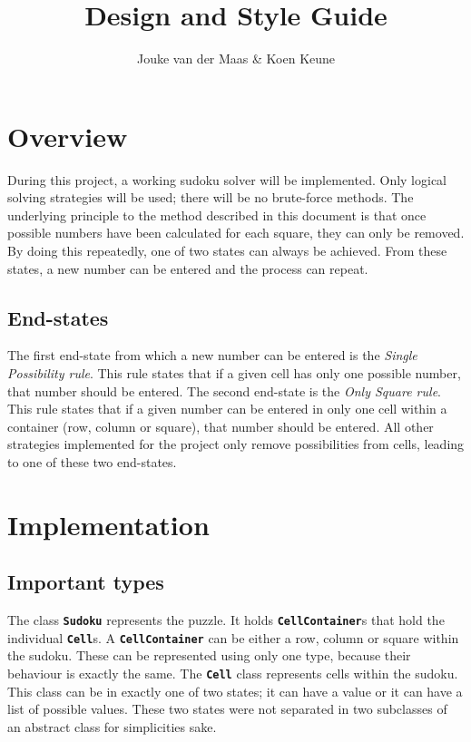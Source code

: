 \documentclass[11pt, a4paper, fleqn]{article}
\title{Design and Style Guide}
\author{Jouke van der Maas \& Koen Keune}
\newcommand{\class}[1]{{\color{class}\textbf{\lstinline{#1}}}}
\begin{document}
\maketitle

\section{Overview}
During this project, a working sudoku solver will be implemented. Only
logical solving strategies will be used; there will be no brute-force methods.
The underlying principle to the method described in this document is that once
possible numbers have been calculated for each square, they can only be removed.
By doing this repeatedly, one of two states can always be achieved. From these
states, a new number can be entered and the process can repeat.

\subsection{End-states}
The first end-state from which a new number can be entered is the 
\emph{Single Possibility rule}. This rule states that if a given cell has only one
possible number, that number should be entered. The second end-state is the \emph{%
Only Square rule}. This rule states that if a given number can be entered in only one
cell within a container (row, column or square), that number should be entered. All
other strategies implemented for the project only remove possibilities from cells, leading
to one of these two end-states.

\section{Implementation}
\subsection{Important types}
The class \class{Sudoku} represents the puzzle. It holds \class{CellContainer}s that hold
the individual \class{Cell}s. A \class{CellContainer} can be either a row, column or square
within the sudoku. These can be represented using only one type, because their behaviour is
exactly the same. The \class{Cell} class represents cells within the sudoku. This class can
be in exactly one of two states; it can have a value or it can have a list of possible values.
These two states were not separated in two subclasses of an abstract class for simplicities sake.
\end{document}
